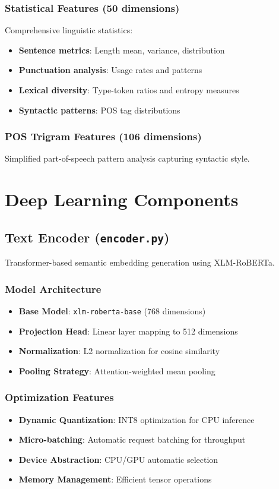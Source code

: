 \documentclass[12pt,a4paper]{article}
\begin{document}
\subsubsection{Statistical Features (50 dimensions)}
Comprehensive linguistic statistics:
\begin{itemize}
    \item \textbf{Sentence metrics}: Length mean, variance, distribution
    \item \textbf{Punctuation analysis}: Usage rates and patterns
    \item \textbf{Lexical diversity}: Type-token ratios and entropy measures
    \item \textbf{Syntactic patterns}: POS tag distributions
\end{itemize}

\subsubsection{POS Trigram Features (106 dimensions)}
Simplified part-of-speech pattern analysis capturing syntactic style.

\section{Deep Learning Components}

\subsection{Text Encoder (\texttt{encoder.py})}

Transformer-based semantic embedding generation using XLM-RoBERTa.

\subsubsection{Model Architecture}
\begin{itemize}
    \item \textbf{Base Model}: \texttt{xlm-roberta-base} (768 dimensions)
    \item \textbf{Projection Head}: Linear layer mapping to 512 dimensions
    \item \textbf{Normalization}: L2 normalization for cosine similarity
    \item \textbf{Pooling Strategy}: Attention-weighted mean pooling
\end{itemize}

\subsubsection{Optimization Features}
\begin{itemize}
    \item \textbf{Dynamic Quantization}: INT8 optimization for CPU inference
    \item \textbf{Micro-batching}: Automatic request batching for throughput
    \item \textbf{Device Abstraction}: CPU/GPU automatic selection
    \item \textbf{Memory Management}: Efficient tensor operations
\end{itemize}
\end{document}
